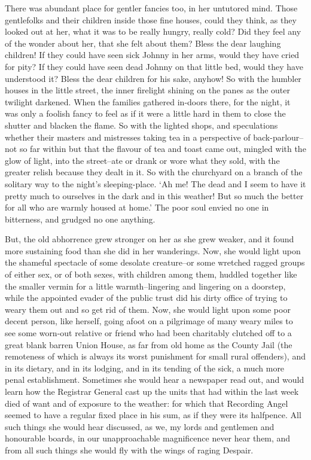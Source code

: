 There was abundant place for gentler fancies too, in her untutored mind.
Those gentlefolks and their children inside those fine houses, could
they think, as they looked out at her, what it was to be really hungry,
really cold? Did they feel any of the wonder about her, that she felt
about them? Bless the dear laughing children! If they could have seen
sick Johnny in her arms, would they have cried for pity? If they could
have seen dead Johnny on that little bed, would they have understood it?
Bless the dear children for his sake, anyhow! So with the humbler houses
in the little street, the inner firelight shining on the panes as the
outer twilight darkened. When the families gathered in-doors there, for
the night, it was only a foolish fancy to feel as if it were a little
hard in them to close the shutter and blacken the flame. So with the
lighted shops, and speculations whether their masters and mistresses
taking tea in a perspective of back-parlour--not so far within but that
the flavour of tea and toast came out, mingled with the glow of light,
into the street--ate or drank or wore what they sold, with the greater
relish because they dealt in it. So with the churchyard on a branch of
the solitary way to the night’s sleeping-place. ‘Ah me! The dead and
I seem to have it pretty much to ourselves in the dark and in this
weather! But so much the better for all who are warmly housed at home.’
The poor soul envied no one in bitterness, and grudged no one anything.

But, the old abhorrence grew stronger on her as she grew weaker, and
it found more sustaining food than she did in her wanderings. Now, she
would light upon the shameful spectacle of some desolate creature--or
some wretched ragged groups of either sex, or of both sexes, with
children among them, huddled together like the smaller vermin for
a little warmth--lingering and lingering on a doorstep, while the
appointed evader of the public trust did his dirty office of trying to
weary them out and so get rid of them. Now, she would light upon some
poor decent person, like herself, going afoot on a pilgrimage of
many weary miles to see some worn-out relative or friend who had been
charitably clutched off to a great blank barren Union House, as far from
old home as the County Jail (the remoteness of which is always its worst
punishment for small rural offenders), and in its dietary, and in
its lodging, and in its tending of the sick, a much more penal
establishment. Sometimes she would hear a newspaper read out, and would
learn how the Registrar General cast up the units that had within the
last week died of want and of exposure to the weather: for which that
Recording Angel seemed to have a regular fixed place in his sum, as if
they were its halfpence. All such things she would hear discussed, as
we, my lords and gentlemen and honourable boards, in our unapproachable
magnificence never hear them, and from all such things she would fly
with the wings of raging Despair.

